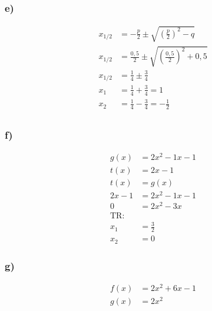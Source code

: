 \documentclass[a4paper, 10pt]{scrartcl}
\begin{document}
	\begin{minipage}{0\textwidth}
		\subsubsection*{e)}
		\begin{align*}
			x_{1/2} &= -\frac{p}{2} \pm\sqrt{(\frac{p}{2})^{2} - q} \\
			x_{1/2} &= \frac{0,5}{2} \pm\sqrt{(\frac{0,5}{2})^{2} + 0,5} \\
			x_{1/2} &= \frac{1}{4} \pm \frac{3}{4} \\
			x_{1} &= \frac{1}{4} + \frac{3}{4} = 1 \\
			x_{2} &= \frac{1}{4} - \frac{3}{4} = -\frac{1}{2} \\
		\end{align*}
		\subsubsection*{f)}
		\begin{align*}
			g(x) &= 2x^{2} - 1x - 1 \\
			t(x) &= 2x - 1 \\
			t(x)&= g(x) \\
			2x - 1&=2x^{2} - 1x - 1 \\
			0 &= 2x^{2} - 3x \\
			\text{TR: } \\
			x_{1} &= \frac{3}{2} \\
			x_{2} &= 0 
		\end{align*}
		\subsubsection*{g)}
		\begin{align*}
			f(x) &= 2x^{2} + 6x - 1 \\
			g(x) &= 2x^{2} \\
		\end{align*}
			 \\
			 \\
	\end{minipage}
\clearpage
\newpage
\end{document}
